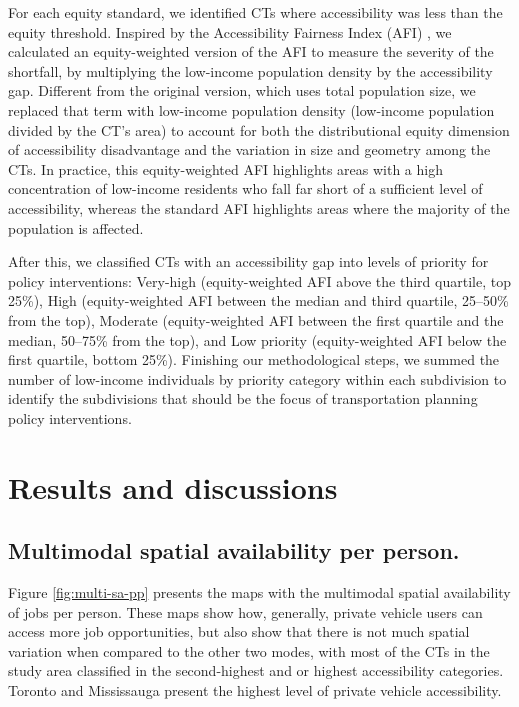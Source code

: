 \documentclass[preprint, 3p,
authoryear]{elsarticle} %
\begin{document}
For each equity standard, we identified CTs where accessibility was less
than the equity threshold. Inspired by the Accessibility Fairness Index
(AFI) \citep{martens2016}, we calculated an equity-weighted version of
the AFI to measure the severity of the shortfall, by multiplying the
low-income population density by the accessibility gap. Different from
the original version, which uses total population size, we replaced that
term with low-income population density (low-income population divided
by the CT's area) to account for both the distributional equity
dimension of accessibility disadvantage and the variation in size and
geometry among the CTs. In practice, this equity-weighted AFI highlights
areas with a high concentration of low-income residents who fall far
short of a sufficient level of accessibility, whereas the standard AFI
highlights areas where the majority of the population is affected.

After this, we classified CTs with an accessibility gap into levels of
priority for policy interventions: Very-high (equity-weighted AFI above
the third quartile, top 25\%), High (equity-weighted AFI between the
median and third quartile, 25--50\% from the top), Moderate
(equity-weighted AFI between the first quartile and the median, 50--75\%
from the top), and Low priority (equity-weighted AFI below the first
quartile, bottom 25\%). Finishing our methodological steps, we summed
the number of low-income individuals by priority category within each
subdivision to identify the subdivisions that should be the focus of
transportation planning policy interventions.

\section{Results and discussions}\label{results-and-discussions}

\subsection{Multimodal spatial availability per
person.}\label{multimodal-spatial-availability-per-person.}

Figure \ref{fig:multi-sa-pp} presents the maps with the multimodal
spatial availability of jobs per person. These maps show how, generally,
private vehicle users can access more job opportunities, but also show
that there is not much spatial variation when compared to the other two
modes, with most of the CTs in the study area classified in the
second-highest and or highest accessibility categories. Toronto and
Mississauga present the highest level of private vehicle accessibility.
\end{document}
